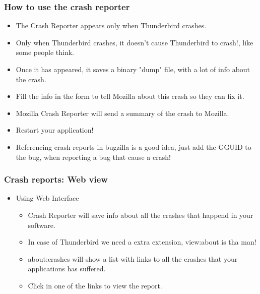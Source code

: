 \documentclass{beamer}
\begin{document}
\begin{frame}
 \frametitle{How to use the crash reporter}
 \begin{itemize}
  \item The Crash Reporter appears only when Thunderbird crashes.
  \item Only when Thunderbird crashes, it doesn't cause Thunderbird to crash!, like some people think.
  \item Once it has appeared, it saves a binary "dump" file, with a lot of info about the crash.
  \item Fill the info in the form to tell Mozilla about this crash so they can fix it.
  \item Mozilla Crash Reporter will send a summary of the crash to Mozilla.
  \item Restart your application!
  \item Referencing crash reports in bugzilla is a good idea, just add the GGUID to the bug, when reporting a bug that cause a crash!
 \end{itemize}
\end{frame}


\begin{frame}
\frametitle{Crash reports: Web view}
 \begin{itemize}
  \item Using Web Interface
     \begin{itemize}
       \item Crash Reporter will save info about all the crashes that happend in your software.
       \item In case of Thunderbird we need a extra extension, view:about is tha man!
       \item about:crashes will show a list with links to all the crashes that your applications has suffered.
       \item Click in one of the links to view the report.
     \end{itemize}
 \end{itemize}
\end{frame}

\end{document}
